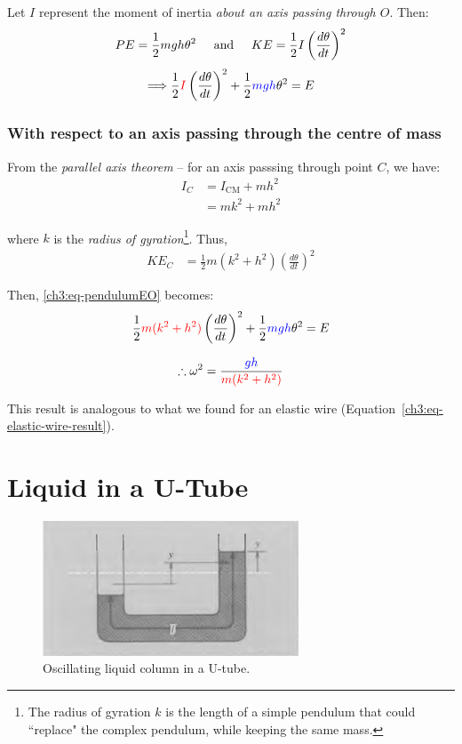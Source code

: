 Let $I$ represent the moment of inertia \emph{about an axis passing through $O$}. Then:
\begin{equation*}
PE = \frac{1}{2} mgh\theta^2 \hspace{0.5cm}\text{and}\hspace{0.5cm}
KE = \frac{1}{2} I\left( \frac{d\theta}{dt} \right)^2
\end{equation*}
\begin{equation} 
	\Longrightarrow
	\frac{1}{2} \textcolor{red}{I}\left( \frac{d\theta}{dt} \right)^2 + \frac{1}{2} \textcolor{blue}{mgh}\theta^2 = E \label{ch3:eq-pendulumEO}
\end{equation}

\subsubsection{With respect to an axis passing through the centre of mass}
From the \emph{parallel axis theorem} -- for an axis passsing through point $C$, we have:
\begin{align*}
	I_C &= I_\text{CM} + mh^2 \\
	&= mk^2 + mh^2
\end{align*}

where $k$ is the \emph{radius of gyration}\footnote{The radius of gyration $k$ is the length of a simple pendulum that could ``replace" the complex pendulum, while keeping the same mass.}. Thus,
\begin{align*}
	KE_C %
	&= \frac{1}{2} m(k^2 + h^2 ) \left( \frac{d\theta}{dt} \right)^2
\end{align*}

Then, \eqref{ch3:eq-pendulumEO} becomes:
\[ \frac{1}{2} \textcolor{red}{m(k^2+h^2)} \left( \frac{d\theta}{dt} \right)^2  + \frac{1}{2} \textcolor{blue}{mgh}\theta^2 = E \]

\begin{equation*}
	\therefore \omega^2 = \frac{\textcolor{blue}{gh}}{\textcolor{red}{m(k^2+h^2)}}
\end{equation*}

This result is analogous to what we found for an elastic wire (Equation~\ref{ch3:eq-elastic-wire-result}).

\section{Liquid in a U-Tube} \label{ch3:sec-uTube}

\begin{figure}[h]
	\centering
	\includegraphics[scale=0.8]{phys232/Ch3-utube.png} \caption{Oscillating liquid column in a U-tube.}\label{ch3:fig-utube}
\end{figure}

